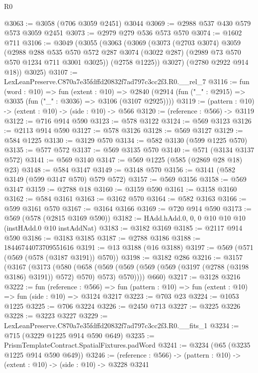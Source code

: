 \begin{lexlean}{R0}
\begin{coremodule}
@3063 := @3058 (@706 @3059 @2451) @3044
@3069 := @2988 @537 @430 @579 @573 @3059 @2451
@3073 := @2979 @279 @536 @573 @570
@3074 := @1602 @711
@3106 := @3049
    (@3055
      (@3063
        (@3069
          (@3073
            (@2703 @3074)
            @3059
            (@2988
              @288
              @535
              @570
              @572
              @287
              @3074
              (@3022 @287)
              (@2989 @73 @570 @570 @1234 @711 @3001 @3025))
            (@2758 @1225))
          @3027)
        (@2780 @2922 @914 @18))
      @3025)
@3107 := LexLeanPreserve.C870a7e35fdffd20832f7ad797c3cc2f3.R0.__rel_7
@3116 := fun (word : @10) =>
  fun (extent : @10) =>
  @2840 (@2914 (fun ("_" : @2915) => @3035 (fun ("_" : @3036) => @3106 (@3107 @2925))))
@3119 := (pattern : @10) -> (extent : @10) -> (side : @10) -> @566
@3120 := (reference : @566) -> @3119
@3122 := @716 @914 @590
@3123 := @578 @3122
@3124 := @569 @3123
@3126 := @2113 @914 @590
@3127 := @578 @3126
@3128 := @569 @3127
@3129 := @584 @1225
@3130 := @3129 @570
@3134 := @582 @3130 (@599 @1225 @570)
@3135 := @577 @572
@3137 := @569 @3135 @570
@3140 := @571 (@3134 @3137 @572)
@3141 := @569 @3140
@3147 := @569 @1225 (@585 (@2869 @28 @18) @23)
@3148 := @584 @3147
@3149 := @3148 @570
@3156 := @3141 (@582 @3149 (@599 @3147 @570) @579 @572)
@3157 := @569 @3156
@3158 := @569 @3147
@3159 := @2788 @18
@3160 := @3159 @590
@3161 := @3158 @3160
@3162 := @584 @3161
@3163 := @3162 @570
@3164 := @582 @3163
@3166 := @599 @3161 @570
@3167 := @3164 @3166
@3169 := @720 @914 @590
@3173 := @569 (@578 (@2815 @3169 @590))
@3182 := HAdd.hAdd.{0, 0, 0} @10 @10 @10 (instHAdd.{0} @10 instAddNat)
@3183 := @3182 @3169
@3185 := @2117 @914 @590
@3186 := @3183 @3185
@3187 := @2788 @3186
@3188 := 18446744073709551616
@3191 := @13 @3188 (@16 @3188)
@3197 := @569 (@571 (@569 (@578 (@3187 @3191)) @570))
@3198 := @3182 @286
@3216 := @3157
    (@3167
      (@3173
        (@580
          (@658
            (@569 (@569 (@569 (@569 (@3197 (@2788 (@3198 @3186) @3191)) @572) @570) @573) @570))))
      @660)
@3217 := @3128 @3216
@3222 := fun (reference : @566) =>
  fun (pattern : @10) => fun (extent : @10) => fun (side : @10) => @3124 @3217
@3223 := @703 @23
@3224 := @1053 @1225
@3225 := @706 @3224
@3226 := @2450 @713
@3227 := @3225 @3226
@3228 := @3223 @3227
@3229 := LexLeanPreserve.C870a7e35fdffd20832f7ad797c3cc2f3.R0.__fits_1
@3234 := @715 (@3229 @1225 @914 @590 @649)
@3235 := PrismTemplateContract.SpatialFixtures.padWord
@3241 := @3234 (@65 (@3235 @1225 @914 @590 @649))
@3246 := (reference : @566) -> (pattern : @10) -> (extent : @10) -> (side : @10) -> @3228 @3241

\end{coremodule}
\end{lexlean}
